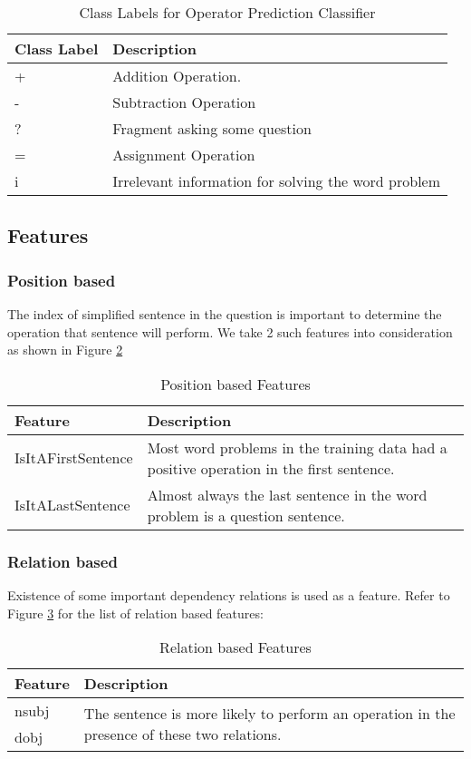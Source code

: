 \documentclass[11pt]{article}
\begin{document}
\begin{table}[h!]
\centering
\begin{tabular}{ | m{2cm} | m{5cm} |}
\hline
\textbf{Class Label} & \textbf{Description}\\ \hline
+ & Addition Operation.\\ \hline
- & Subtraction Operation\\ \hline
? & Fragment asking some question\\ \hline
= & Assignment Operation\\ \hline
i & Irrelevant information for solving the word problem \\ \hline
\end{tabular}
\caption{Class Labels for Operator Prediction Classifier}
\label{figure:7}
\end{table}

\subsection{Features}
\subsubsection{Position based}
The index of simplified sentence in the question is important to determine the operation that sentence will perform. We take 2 such features into consideration as shown in Figure \ref{figure:8}
\begin{table}[h!]
\centering
\begin{tabular}{ | m{3cm} | m{4cm} |}
\hline
\textbf{Feature} & \textbf{Description}\\ \hline
IsItAFirstSentence & Most word problems in the training data had a positive operation in the first sentence.\\ \hline
IsItALastSentence & Almost always the last sentence in the word problem is a question sentence.\\ \hline
\end{tabular}
\caption{Position based Features}
\label{figure:8}
\end{table}

\subsubsection{Relation based}
Existence of some important dependency relations is used as a feature. Refer to Figure \ref{figure:9} for the list of relation based features:
\begin{table}[H]
\begin{tabular}{|m{2cm} | m{5cm}|}
\hline 
\textbf{Feature} & \textbf{Description}\\ \hline
nsubj & \multirow{2}{5cm}{\centering The sentence is more likely to perform an operation in the presence of these two relations.} \\[10pt]
\cline{1-1} 
 dobj & \\[10pt]
\hline
\end{tabular}
\caption{Relation based Features}
\label{figure:9}
\end{table}
\end{document}
